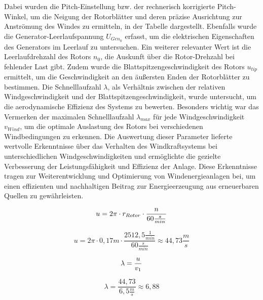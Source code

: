 \newpage
     Dabei wurden die Pitch-Einstellung bzw. der rechnerisch korrigierte Pitch-Winkel, um die Neigung der Rotorblätter und deren 
     präzise Ausrichtung zur Anströmung des Windes zu ermitteln, in der Tabelle dargestellt. Ebenfalls wurde die Generator-Leerlaufspannung $U_{Gen_0}$ erfasst, 
     um die elektrischen Eigenschaften des Generators im Leerlauf zu untersuchen. Ein weiterer relevanter Wert ist die Leerlaufdrehzahl des Rotors $n_0$, 
     die Auskunft über die Rotor-Drehzahl bei fehlender Last gibt. Zudem wurde die Blattspitzengeschwindigkeit des Rotors $u_{tip}$ ermittelt, um die Geschwindigkeit an den äußersten Enden der Rotorblätter zu bestimmen. 
     Die Schnelllaufzahl $\lambda$, als Verhältnis zwischen der relativen Windgeschwindigkeit und der Blattspitzengeschwindigkeit, wurde untersucht, um die aerodynamische Effizienz des Systems zu bewerten. Besonders wichtig war das Vermerken der maximalen
    Schnelllaufzahl $\lambda_{max}$ für jede Windgeschwindigkeit $v_{Wind}$, um die optimale Auslastung des Rotors bei verschiedenen Windbedingungen zu erkennen. Die Auswertung dieser Parameter lieferte
    wertvolle Erkenntnisse über das Verhalten des Windkraftsystems bei unterschiedlichen Windgeschwindigkeiten und ermöglichte die gezielte Verbesserung der Leistungsfähigkeit und Effizienz der Anlage. Diese Erkenntnisse tragen zur Weiterentwicklung und 
    Optimierung von Windenergieanlagen bei,
     um einen effizienten und nachhaltigen 
     Beitrag zur Energieerzeugung aus erneuerbaren Quellen zu gewährleisten.

\begin{equation}
    \centering
    u = 2 \pi \cdot r_{Rotor} \cdot \frac{n}{60 \frac{s}{min}}
    \label{eq:230615_Umfangsgeschwindigkeit}
\end{equation}

$$    u = 2 \pi \cdot 0,17m \cdot \frac{2512,5 \frac{1}{min}}{60 \frac{s}{min}}\approx 44,73\frac{m}{s} $$

\begin{equation}
    \centering
    \lambda = \frac{u}{v_1}
    \label{eq:230615_Schnelllaufzahl}
\end{equation}

$$\lambda = \frac{44,73}{6,5 \frac{m}{s}}\approx 6,88$$

